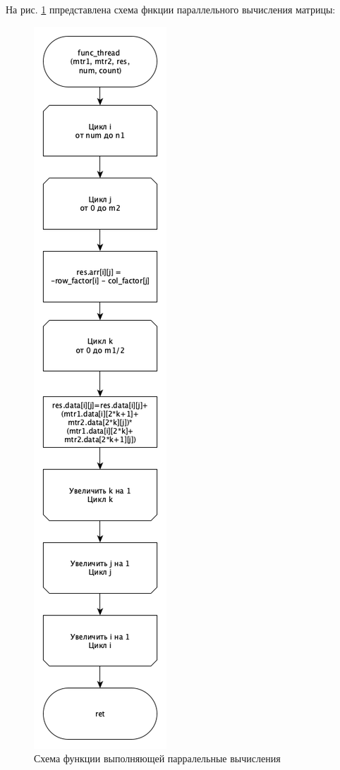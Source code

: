 \documentclass[12pt]{report}
\begin{document}
На рис. \ref{fig:def} ппредставлена схема фнкции параллельного вычисления матрицы:
	\begin{figure}[h]
        	\begin{center}
        		\includegraphics[scale=0.32]{parallel_func}
        		\caption{Схема функции выполняющей парралельные вычисления}
        		\label{fig:def}
        	\end{center}
        \end{figure}
\end{document}
